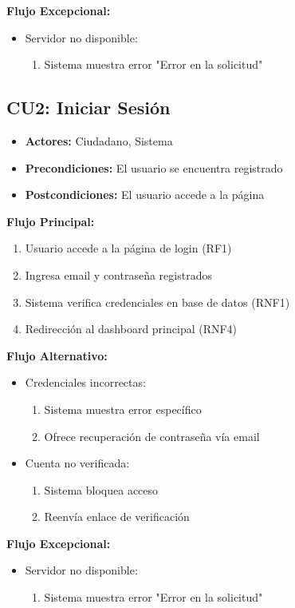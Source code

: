 \begin{multicols}{2}
\textbf{Flujo Excepcional:}
\begin{itemize}
    \item Servidor no disponible:
    \begin{enumerate}
        \item Sistema muestra error "Error en la solicitud" 
    \end{enumerate}
\end{itemize}

\subsection*{CU2: Iniciar Sesión}
\begin{itemize}
    \item \textbf{Actores:} Ciudadano, Sistema
    \item \textbf{Precondiciones:} El usuario se encuentra registrado 
    \item \textbf{Postcondiciones:} El usuario accede a la página
\end{itemize}
\textbf{Flujo Principal:}
\begin{enumerate}
    \item Usuario accede a la página de login (RF1)
    \item Ingresa email y contraseña registrados
    \item Sistema verifica credenciales en base de datos (RNF1)
    \item Redirección al dashboard principal (RNF4)
\end{enumerate}

\textbf{Flujo Alternativo:}
\begin{itemize}
    \item Credenciales incorrectas:
    \begin{enumerate}
        \item Sistema muestra error específico
        \item Ofrece recuperación de contraseña vía email
    \end{enumerate}
    \item Cuenta no verificada:
    \begin{enumerate}
        \item Sistema bloquea acceso
        \item Reenvía enlace de verificación
    \end{enumerate}
\end{itemize}

\textbf{Flujo Excepcional:}
\begin{itemize}
    \item Servidor no disponible:
    \begin{enumerate}
        \item Sistema muestra error "Error en la solicitud"
    \end{enumerate}
\end{itemize}


\end{multicols}

